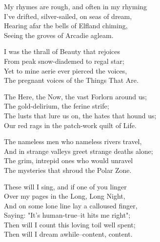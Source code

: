 
\begin{poemblock}
My rhymes are rough, and often in my rhyming\\
\idt I've drifted, silver-sailed, on seas of dream,\\
Hearing afar the bells of Elfland chiming,\\
\idt Seeing the groves of Arcadie agleam.

I was the thrall of Beauty that rejoices\\
\idt From peak snow-diademed to regal star;\\
Yet to mine aerie ever pierced the voices,\\
\idt The pregnant voices of the Things That Are.

The Here, the Now, the vast Forlorn around us;\\
\idt The gold-delirium, the ferine strife;\\
The lusts that lure us on, the hates that hound us;\\
\idt Our red rags in the patch-work quilt of Life.

The nameless men who nameless rivers travel,\\
\idt And in strange valleys greet strange deaths alone;\\
\idt The grim, intrepid ones who would unravel\\
The mysteries that shroud the Polar Zone.

These will I sing, and if one of you linger\\
\idt Over my pages in the Long, Long Night,\\
And on some lone line lay a calloused finger,\\
\idt Saying:  "It's human-true--it hits me right";\\
Then will I count this loving toil well spent;\\
Then will I dream awhile--content, content.
\end{poemblock}
